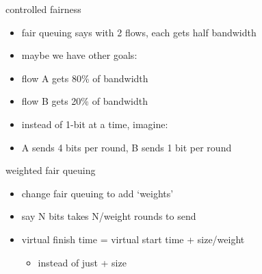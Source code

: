 \begin{frame}{controlled fairness}
    \begin{itemize}
    \item fair queuing says with 2 flows, each gets half bandwidth
    \item maybe we have other goals:
    \item flow A gets 80\% of bandwidth
    \item flow B gets 20\% of bandwidth
    \vspace{.5cm}
    \item<2-> instead of 1-bit at a time, imagine:
    \item<2-> A sends 4 bits per round, B sends 1 bit per round
    \end{itemize}
\end{frame}

\begin{frame}{weighted fair queuing}
    \begin{itemize}
    \item change fair queuing to add `weights'
    \item say N bits takes N/weight rounds to send
    \vspace{.5cm}
    \item virtual finish time = virtual start time + size/weight
        \begin{itemize}
        \item instead of just + size
        \end{itemize}
    \end{itemize}
\end{frame}
